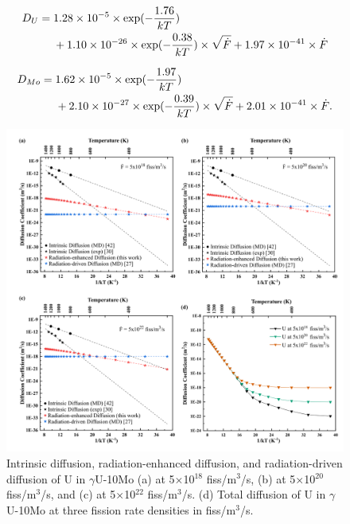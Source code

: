 \documentclass[preprint,12pt]{elsarticle}
\begin{document}
\begin{align} 
D_{U}={}& 1.28\times10^{-5}\times \mbox{exp}(-\frac{1.76}{kT}) \\ 
&+1.10\times10^{-26}\times \mbox{exp}(-\frac{0.38}{kT})\times \sqrt{\dot{F}} + 1.97\times10^{-41}\times \dot{F} \notag
\end{align}

\begin{align} 
D_{Mo}={}& 1.62\times10^{-5}\times \mbox{exp}(-\frac{1.97}{kT})\\ 
&+2.10\times10^{-27}\times \mbox{exp}(-\frac{0.39}{kT})\times \sqrt{\dot{F}} + 2.01\times10^{-41}\times \dot{F}. \notag
\end{align}

\begin{figure}[hbt!]
\centering
\includegraphics[width=1\textwidth]{Fig5.png}
\caption{Intrinsic diffusion, radiation-enhanced diffusion, and radiation-driven diffusion of U in $\gamma$U-10Mo (a) at 5$\times$10$^{18}$ fiss/m$^{3}$/s, (b) at 5$\times$10$^{20}$ fiss/m$^{3}$/s, and (c) at 5$\times$10$^{22}$ fiss/m$^{3}$/s. (d) Total diffusion of U in $\gamma$U-10Mo at three fission rate densities in fiss/m$^{3}$/s.}
\label{fig:eachU}
\end{figure}
\end{document}
